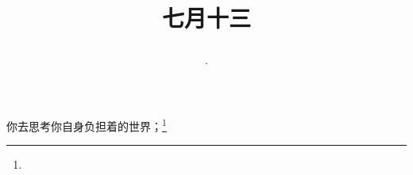 \title{\date[d=16,m=8,y=2024][year:cn-y,年,month:cn,day:cn,日,·,weekday]·七月十三 }
你去思考你自身负担着的世界；\footnote{ }

